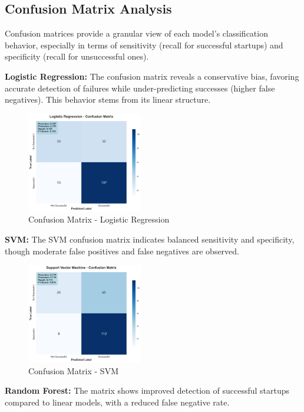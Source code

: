 \documentclass[conference]{IEEEtran}
\begin{document}
\subsection{Confusion Matrix Analysis}

Confusion matrices provide a granular view of each model’s classification behavior, especially in terms of sensitivity (recall for successful startups) and specificity (recall for unsuccessful ones).

\textbf{Logistic Regression:} The confusion matrix reveals a conservative bias, favoring accurate detection of failures while under-predicting successes (higher false negatives). This behavior stems from its linear structure.

\begin{figure}[H]
    \centering
    \includegraphics[width=0.45\textwidth]{confusion_matrix_logistic_regression.png}
    \caption{Confusion Matrix - Logistic Regression}
\end{figure}

\textbf{SVM:} The SVM confusion matrix indicates balanced sensitivity and specificity, though moderate false positives and false negatives are observed.

\begin{figure}[H]
    \centering
    \includegraphics[width=0.45\textwidth]{confusion_matrix_support_vector_machine.png}
    \caption{Confusion Matrix - SVM}
\end{figure}

\textbf{Random Forest:} The matrix shows improved detection of successful startups compared to linear models, with a reduced false negative rate.
\end{document}

